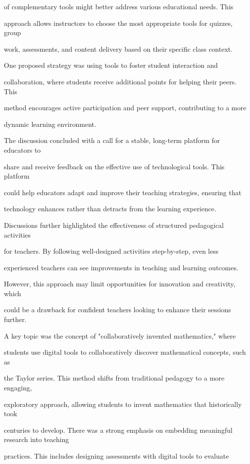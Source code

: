 \documentclass[11pt]{article}
\begin{document}
of complementary tools might better address various educational needs. This

approach allows instructors to choose the most appropriate tools for quizzes, group

work, assessments, and content delivery based on their specific class context.

One proposed strategy was using tools to foster student interaction and

collaboration, where students receive additional points for helping their peers. This

method encourages active participation and peer support, contributing to a more

dynamic learning environment.

The discussion concluded with a call for a stable, long-term platform for educators to

share and receive feedback on the effective use of technological tools. This platform

could help educators adapt and improve their teaching strategies, ensuring that

technology enhances rather than detracts from the learning experience.

Discussions further highlighted the effectiveness of structured pedagogical activities

for teachers. By following well-designed activities step-by-step, even less

experienced teachers can see improvements in teaching and learning outcomes.

However, this approach may limit opportunities for innovation and creativity, which

could be a drawback for confident teachers looking to enhance their sessions further.

A key topic was the concept of "collaboratively invented mathematics," where

students use digital tools to collaboratively discover mathematical concepts, such as

the Taylor series. This method shifts from traditional pedagogy to a more engaging,

exploratory approach, allowing students to invent mathematics that historically took

centuries to develop. There was a strong emphasis on embedding meaningful research into teaching

practices. This includes designing assessments with digital tools to evaluate
\end{document}
